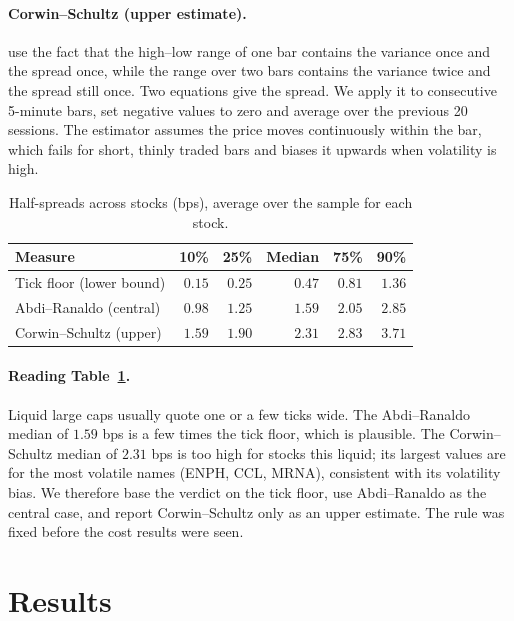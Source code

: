 \documentclass[11pt,a4paper]{article}
\begin{document}
\paragraph{Corwin--Schultz (upper estimate).} \citet{corwin2012} use the fact that the high--low range of
one bar contains the variance once and the spread once, while the range over two bars contains the
variance twice and the spread still once. Two equations give the spread. We apply it to consecutive
5-minute bars, set negative values to zero and average over the previous 20 sessions. The
estimator assumes the price moves continuously within the bar, which fails for short, thinly traded bars
and biases it upwards when volatility is high.

\begin{table}[htbp]
\centering
\caption{Half-spreads across stocks (bps), average over the sample for each stock.}
\label{tab:costdist}
\small
\begin{tabular}{@{}lrrrrr@{}}
\toprule
Measure & 10\% & 25\% & Median & 75\% & 90\% \\
\midrule
Tick floor (lower bound) & $0.15$ & $0.25$ & $0.47$ & $0.81$ & $1.36$ \\
Abdi--Ranaldo (central) & $0.98$ & $1.25$ & $1.59$ & $2.05$ & $2.85$ \\
Corwin--Schultz (upper) & $1.59$ & $1.90$ & $2.31$ & $2.83$ & $3.71$ \\
\bottomrule
\end{tabular}
\end{table}

\paragraph{Reading Table~\ref{tab:costdist}.} Liquid large caps usually quote one or a few ticks wide.
The Abdi--Ranaldo median of $1.59$ bps is a few times the tick floor, which is plausible. The
Corwin--Schultz median of $2.31$ bps is too high for stocks this liquid; its largest values are for the
most volatile names (ENPH, CCL, MRNA), consistent with its volatility bias. We therefore base the verdict on
the tick floor, use Abdi--Ranaldo as the central case, and report Corwin--Schultz only as an upper estimate. The rule was fixed before the cost results were seen.

\section{Results}
\label{sec:results}
\end{document}
